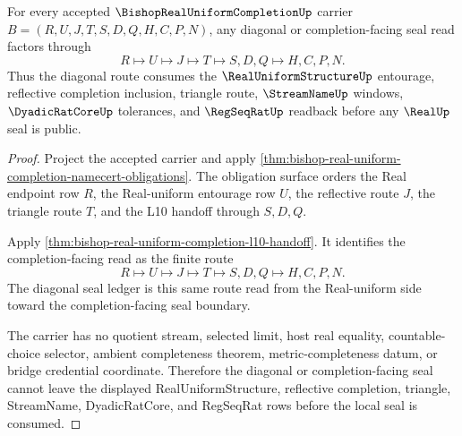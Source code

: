 \begin{theorem}
\label{thm:bishop-real-uniform-completion-diagonal-seal-ledger}
For every accepted $\BishopRealUniformCompletionUp$ carrier $B=(R,U,J,T,S,D,Q,H,C,P,N)$, any diagonal or completion-facing seal read factors through
$$
R\longmapsto U\longmapsto J\longmapsto T\longmapsto S,D,Q\longmapsto H,C,P,N .
$$
Thus the diagonal route consumes the $\RealUniformStructureUp$ entourage, reflective completion inclusion, triangle route, $\StreamNameUp$ windows, $\DyadicRatCoreUp$ tolerances, and $\RegSeqRatUp$ readback before any $\RealUp$ seal is public.
\end{theorem}
\begin{proof}
Project the accepted carrier and apply \autoref{thm:bishop-real-uniform-completion-namecert-obligations}. The obligation surface orders the Real endpoint row $R$, the Real-uniform entourage row $U$, the reflective route $J$, the triangle route $T$, and the L10 handoff through $S,D,Q$.

Apply \autoref{thm:bishop-real-uniform-completion-l10-handoff}. It identifies the completion-facing read as the finite route
$$
R\longmapsto U\longmapsto J\longmapsto T\longmapsto S,D,Q\longmapsto H,C,P,N .
$$
The diagonal seal ledger is this same route read from the Real-uniform side toward the completion-facing seal boundary.

The carrier has no quotient stream, selected limit, host real equality, countable-choice selector, ambient completeness theorem, metric-completeness datum, or bridge credential coordinate. Therefore the diagonal or completion-facing seal cannot leave the displayed RealUniformStructure, reflective completion, triangle, StreamName, DyadicRatCore, and RegSeqRat rows before the local seal is consumed.
\end{proof}

